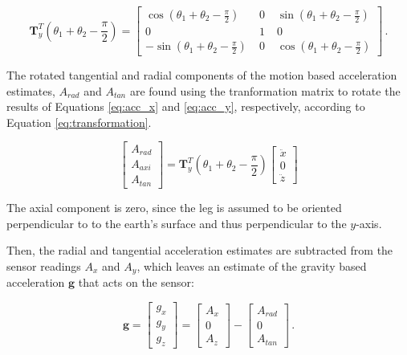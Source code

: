 \begin{equation}
\mathbf{T}^T_y(\theta_1 + \theta_2 - \frac{\pi}{2}) = \begin{bmatrix}
    \cos (\theta_1 + \theta_2 - \frac{\pi}{2}) \; & 0 \; & \sin (\theta_1 + \theta_2 - \frac{\pi}{2}) \\
    0 \; & 1 \; & 0 \\
    -\sin (\theta_1 + \theta_2 - \frac{\pi}{2}) \; & 0 \; & \cos (\theta_1 + \theta_2 - \frac{\pi}{2})
    \end{bmatrix}\,.
\end{equation}

\noindent
The rotated tangential and radial components of the motion based acceleration estimates, $A_{rad}$ and $A_{tan}$ are found using the tranformation matrix to rotate the results of Equations \ref{eq:acc_x} and \ref{eq:acc_y}, respectively, according to Equation \ref{eq:transformation}.

\begin{equation}
  \begin{bmatrix}
  	A_{rad} \\
  	A_{axi} \\
  	A_{tan}
  \end{bmatrix} = \mathbf{T}^T_y(\theta_1 + \theta_2 - \frac{\pi}{2}) \begin{bmatrix}
  	\ddot{x} \\
  	0 \\
	\ddot{z}
  \end{bmatrix}
\end{equation}

\noindent
The axial component is zero, since the leg is assumed to be oriented perpendicular to to the earth's surface and thus perpendicular to the $y$-axis.

Then, the radial and tangential acceleration estimates are subtracted from the sensor readings $A_x$ and $A_y$, which leaves an estimate of the gravity based acceleration $\mathbf{g}$ that acts on the sensor:

\begin{equation}
\mathbf{g} = \begin{bmatrix}
    g_x \\
    g_y \\
    g_z 
    \end{bmatrix} = 
    \begin{bmatrix}
    A_x \\
    0 \\
    A_z 
    \end{bmatrix} -
    \begin{bmatrix}
    A_{rad} \\
    0 \\
    A_{tan} 
    \end{bmatrix}\,.
\end{equation}

